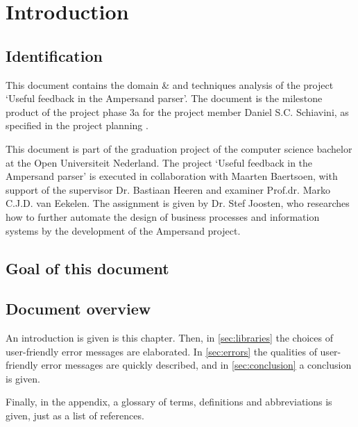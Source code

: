 \section{Introduction}
\subsection{Identification}
This document contains the domain \& and techniques analysis of the project `Useful feedback in the Ampersand parser'.
The document is the milestone product of the project phase 3a for the project member Daniel S.C. Schiavini, as specified in the project planning \cite{plan}.

This document is part of the graduation project of the computer science bachelor at the Open Universiteit Nederland.
The project `Useful feedback in the Ampersand parser' is executed in collaboration with Maarten Baertsoen, with support of the supervisor Dr. Bastiaan Heeren and examiner Prof.dr. Marko C.J.D. van Eekelen.
The assignment is given by Dr. Stef Joosten, who researches how to further automate the design of business processes and information systems by the development of the Ampersand project.

\subsection{Goal of this document}
\lipsum[1]

\subsection{Document overview}
An introduction is given is this chapter.
Then, in \autoref{sec:libraries} the choices of user-friendly error messages are elaborated.
In \autoref{sec:errors} the qualities of user-friendly error messages are quickly described, and in \autoref{sec:conclusion} a conclusion is given.

Finally, in the appendix, a glossary of terms, definitions and abbreviations is given, just as a list of references.
